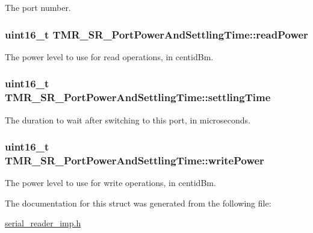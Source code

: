 The port number. \hypertarget{struct_t_m_r___s_r___port_power_and_settling_time_82a346e3e5eb4484bc83a235e17630c0}{
\subsubsection[{readPower}]{\setlength{\rightskip}{0pt plus 5cm}uint16\_\-t {\bf TMR\_\-SR\_\-PortPowerAndSettlingTime::readPower}}}
\label{struct_t_m_r___s_r___port_power_and_settling_time_82a346e3e5eb4484bc83a235e17630c0}


The power level to use for read operations, in centidBm. \hypertarget{struct_t_m_r___s_r___port_power_and_settling_time_33aac95957a2b7864ccb0fe59e995df5}{
\subsubsection[{settlingTime}]{\setlength{\rightskip}{0pt plus 5cm}uint16\_\-t {\bf TMR\_\-SR\_\-PortPowerAndSettlingTime::settlingTime}}}
\label{struct_t_m_r___s_r___port_power_and_settling_time_33aac95957a2b7864ccb0fe59e995df5}


The duration to wait after switching to this port, in microseconds. \hypertarget{struct_t_m_r___s_r___port_power_and_settling_time_dc46c39f7165e214e9a233a4256d91c7}{
\subsubsection[{writePower}]{\setlength{\rightskip}{0pt plus 5cm}uint16\_\-t {\bf TMR\_\-SR\_\-PortPowerAndSettlingTime::writePower}}}
\label{struct_t_m_r___s_r___port_power_and_settling_time_dc46c39f7165e214e9a233a4256d91c7}


The power level to use for write operations, in centidBm. 

The documentation for this struct was generated from the following file:\begin{CompactItemize}
\item 
\hyperlink{serial__reader__imp_8h}{serial\_\-reader\_\-imp.h}\end{CompactItemize}
